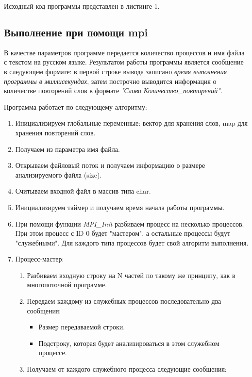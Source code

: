 \documentclass[12pt,a4paper]{report}
\begin{document}
				Исходный код программы представлен в листинге 1.
				
			\subsection{Выполнение при помощи mpi}
				В качестве параметров программе передается количество процессов и имя файла с текстом на русском языке. Результатом работы программы является сообщение в следующем формате: в первой строке вывода записано \textit{время выполнения программы в миллисекундах}, затем построчно выводится информация о количестве повторений слов в формате \textit{"Слово Количество\_повторений"}.
				
					Программа работает по следующему алгоритму:
					\begin{enumerate}
					\item Инициализируем глобальные переменные: вектор для хранения слов, map для хранения повторений слов.
					\item Получаем из параметра имя файла.
					\item Открываем файловый поток и получаем информацию о размере анализируемого файла (size).
					\item Считываем входной файл в массив типа char.
					\item Инициализируем таймер и получаем время начала работы программы.
					\item При помощи функции \textit{MPI\_Init} разбиваем процесс на несколько процессов. При этом процесс с ID 0 будет "мастером", а остальные процессы будут "служебными". Для каждого типа процессов будет свой алгоритм выполнения.
						\item Процесс-мастер:
							\begin{enumerate}
								\item Разбиваем входную строку на N частей по такому же принципу, как в многопоточной программе.
								\item Передаем каждому из служебных процессов последовательно два сообщения:
									\begin{itemize}
										\item Размер передаваемой строки.
										\item Подстроку, которая будет анализироваться в этом служебном процессе.
									\end{itemize}
								\item Получаем от каждого служебного процесса следующие сообщения:
									\begin{itemize}

\end{itemize}
\end{enumerate}
\end{enumerate}
\end{document}
